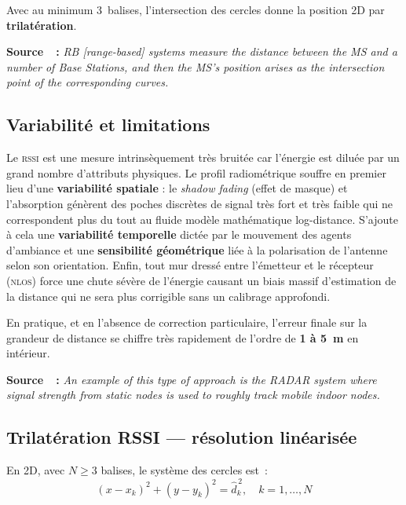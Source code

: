 \documentclass[12pt, a4paper]{article}
\newcommand{\RSSI}{\textsc{rssi}}
\newcommand{\NLOS}{\textsc{nlos}}
\begin{document}
Avec au minimum 3~balises, l'intersection des cercles donne la position 2D par
\textbf{trilatération}.

\begin{citebox}
\textbf{Source~\cite{Mitilineos2010}~:} \og{}\textit{RB [range-based] systems
measure the distance between the MS and a number of Base Stations, and then the MS's
position arises as the intersection point of the corresponding curves.}\fg{}
\end{citebox}

\subsection{Variabilité et limitations}

Le \RSSI{} est une mesure intrinsèquement très bruitée car l'énergie est diluée par un grand nombre d'attributs physiques. Le profil radiométrique souffre en premier lieu d'une \textbf{variabilité spatiale} : le \textit{shadow fading} (effet de masque) et l'absorption génèrent des poches discrètes de signal très fort et très faible qui ne correspondent plus du tout au fluide modèle mathématique log-distance. S'ajoute à cela une \textbf{variabilité temporelle} dictée par le mouvement des agents d'ambiance et une \textbf{sensibilité géométrique} liée à la polarisation de l'antenne selon son orientation. Enfin, tout mur dressé entre l'émetteur et le récepteur (\NLOS{}) force une chute sévère de l'énergie causant un biais massif d'estimation de la distance qui ne sera plus corrigible sans un calibrage approfondi.

En pratique, et en l'absence de correction particulaire, l'erreur finale sur la grandeur de distance se chiffre très rapidement de l'ordre de \textbf{1 à 5~m} en intérieur.

\begin{citebox}
\textbf{Source~\cite{Klingbeil2008}~:} \og{}\textit{An example of this type of
approach is the RADAR system where signal strength from static nodes is used to
roughly track mobile indoor nodes.}\fg{}
\end{citebox}

\subsection{Trilatération RSSI — résolution linéarisée}

En 2D, avec $N \geq 3$ balises, le système des cercles est~:
\[
  (x - x_k)^2 + (y - y_k)^2 = \hat{d}_k^{\,2}, \quad k = 1, \ldots, N
\]
\end{document}
